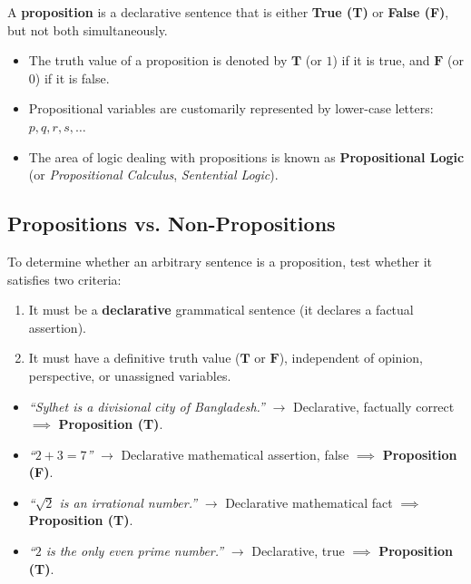 \documentclass[11pt,a4paper]{article}
\begin{document}
\begin{defbox}
A \textbf{proposition} is a declarative sentence that is either \textbf{True (T)} or \textbf{False (F)}, but not both simultaneously.
\begin{itemize}
    \item The truth value of a proposition is denoted by $\mathbf{T}$ (or $1$) if it is true, and $\mathbf{F}$ (or $0$) if it is false.
    \item Propositional variables are customarily represented by lower-case letters: $p, q, r, s, \dots$
    \item The area of logic dealing with propositions is known as \textbf{Propositional Logic} (or \textit{Propositional Calculus}, \textit{Sentential Logic}).
\end{itemize}
\end{defbox}

\subsection{Propositions vs. Non-Propositions}
To determine whether an arbitrary sentence is a proposition, test whether it satisfies two criteria:
\begin{enumerate}
    \item It must be a \textbf{declarative} grammatical sentence (it declares a factual assertion).
    \item It must have a definitive truth value ($\mathbf{T}$ or $\mathbf{F}$), independent of opinion, perspective, or unassigned variables.
\end{enumerate}

\begin{examplebox}
\begin{itemize}
    \item \textit{``Sylhet is a divisional city of Bangladesh.''} $\longrightarrow$ Declarative, factually correct $\implies$ \textbf{Proposition (T)}.
    \item \textit{``$2 + 3 = 7$''} $\longrightarrow$ Declarative mathematical assertion, false $\implies$ \textbf{Proposition (F)}.
    \item \textit{``$\sqrt{2}$ is an irrational number.''} $\longrightarrow$ Declarative mathematical fact $\implies$ \textbf{Proposition (T)}.
    \item \textit{``$2$ is the only even prime number.''} $\longrightarrow$ Declarative, true $\implies$ \textbf{Proposition (T)}.
\end{itemize}
\end{examplebox}
\end{document}
